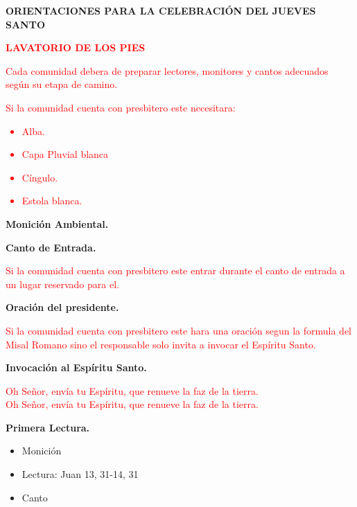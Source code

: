 \documentclass[12pt, letterpaper]{article}
\begin{document}
    \begin{center}
    \Large {\bfseries ORIENTACIONES PARA LA CELEBRACIÓN DEL JUEVES SANTO}
    \end{center}

    \begin{center}
    \large {\bfseries \textcolor{red}{LAVATORIO DE LOS PIES}}
    \end{center}
    \normalsize {\textcolor{red}{Cada comunidad debera de preparar lectores, monitores y cantos adecuados según su etapa de camino.}\\
    \normalsize {\textcolor{red}{Si la comunidad cuenta con presbitero este necesitara:}
    \textcolor{red}{
        \begin{itemize}
            \item Alba.
            \item Capa Pluvial blanca
            \item Cíngulo.
            \item Estola blanca.
        \end{itemize}
    }

    \large {\bfseries Monición Ambiental.}

    \large {\bfseries Canto de Entrada.}\\
    \normalsize {\textcolor{red}{Si la comunidad cuenta con presbitero este entrar durante el canto de entrada a un lugar reservado para el.}

    \large {\bfseries Oración del presidente.}\\
    \normalsize {\textcolor{red}{Si la comunidad cuenta con presbitero este hara una oración segun la formula del Misal Romano sino el responsable solo invita a invocar el Espíritu Santo.}

    \large {\bfseries Invocación al Espíritu Santo.}\\
    \normalsize {\textcolor{red}{Oh Señor, envía tu Espíritu, que renueve la faz de la tierra.\\ Oh Señor, envía tu Espíritu, que renueve la faz de la tierra.}

    \large {\bfseries Primera Lectura.}
    \begin{itemize}
     \item \normalsize Monición
     \item Lectura: Juan 13, 31-14, 31
     \item Canto
    \end{itemize}

}}}}}
\end{document}
